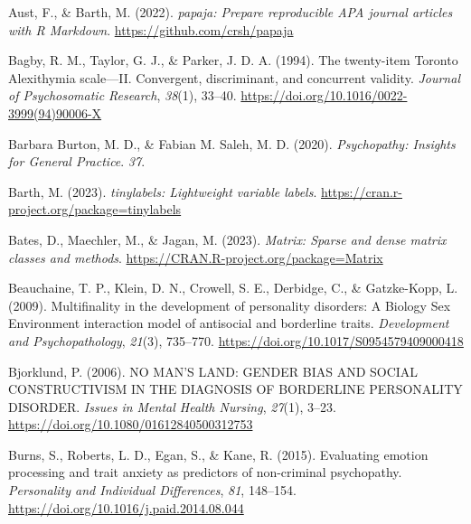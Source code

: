 \documentclass[
  man,floatsintext]{apa7}
\newlength{\cslhangindent}
\newlength{\cslentryspacingunit} %
\newenvironment{CSLReferences}[2] %
 {%
  \setlength{\parindent}{0pt}
  \ifodd #1
  \let\oldpar\par
  \def\par{\hangindent=\cslhangindent\oldpar}
  \fi
  \setlength{\parskip}{#2\cslentryspacingunit}
 }%
 {}
\begin{document}
\hypertarget{refs}{}
\begin{CSLReferences}{1}{0}
\leavevmode{}%
Aust, F., \& Barth, M. (2022). \emph{{papaja}: {Prepare} reproducible {APA} journal articles with {R Markdown}}. \url{https://github.com/crsh/papaja}

\leavevmode{}%
Bagby, R. M., Taylor, G. J., \& Parker, J. D. A. (1994). The twenty-item {Toronto Alexithymia} scale---{II}. {Convergent}, discriminant, and concurrent validity. \emph{Journal of Psychosomatic Research}, \emph{38}(1), 33--40. \url{https://doi.org/10.1016/0022-3999(94)90006-X}

\leavevmode{}%
Barbara Burton, M. D., \& Fabian M. Saleh, M. D. (2020). \emph{Psychopathy: {Insights} for {General Practice}}. \emph{37}.

\leavevmode{}%
Barth, M. (2023). \emph{{tinylabels}: Lightweight variable labels}. \url{https://cran.r-project.org/package=tinylabels}

\leavevmode{}%
Bates, D., Maechler, M., \& Jagan, M. (2023). \emph{Matrix: Sparse and dense matrix classes and methods}. \url{https://CRAN.R-project.org/package=Matrix}

\leavevmode{}%
Beauchaine, T. P., Klein, D. N., Crowell, S. E., Derbidge, C., \& Gatzke-Kopp, L. (2009). Multifinality in the development of personality disorders: {A Biology} {\texttimes} {Sex} {\texttimes} {Environment} interaction model of antisocial and borderline traits. \emph{Development and Psychopathology}, \emph{21}(3), 735--770. \url{https://doi.org/10.1017/S0954579409000418}

\leavevmode{}%
Bjorklund, P. (2006). {NO MAN}'{S LAND}: {GENDER BIAS AND SOCIAL CONSTRUCTIVISM IN THE DIAGNOSIS OF BORDERLINE PERSONALITY DISORDER}. \emph{Issues in Mental Health Nursing}, \emph{27}(1), 3--23. \url{https://doi.org/10.1080/01612840500312753}

\leavevmode{}%
Burns, S., Roberts, L. D., Egan, S., \& Kane, R. (2015). Evaluating emotion processing and trait anxiety as predictors of non-criminal psychopathy. \emph{Personality and Individual Differences}, \emph{81}, 148--154. \url{https://doi.org/10.1016/j.paid.2014.08.044}


\end{CSLReferences}
\end{document}
